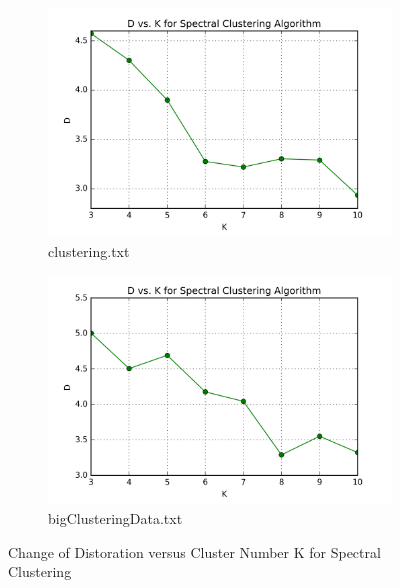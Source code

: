 \begin{figure}[H]
\centering
\centering
        \begin{subfigure}[b]{0.49\textwidth}
            \centering
            \includegraphics[width=\textwidth]{./figures/loss_clustering_spectral.png}
            \caption{clustering.txt}\label{fig:12a}
        \end{subfigure}
        \hfill
        \begin{subfigure}[b]{0.49\textwidth}  
            \centering 
            \includegraphics[width=\textwidth]{./figures/loss_bigClustering_spectral.png}
            \caption{bigClusteringData.txt}\label{fig:12b}
        \end{subfigure}
\caption{Change of Distoration versus Cluster Number K for Spectral Clustering}
\label{fig:k-means-loss} 
\end{figure}

